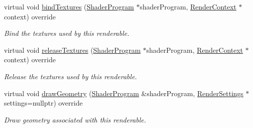 \begin{Indent}
\begin{DoxyCompactItemize}
\mbox{\label{classrev_1_1_label_a011b2eee8123ce24b2483dde4c17dbbf}} 
virtual void \mbox{\hyperlink{classrev_1_1_label_a011b2eee8123ce24b2483dde4c17dbbf}{bind\+Textures}} (\mbox{\hyperlink{classrev_1_1_shader_program}{Shader\+Program}} $\ast$shader\+Program, \mbox{\hyperlink{classrev_1_1_render_context}{Render\+Context}} $\ast$context) override
\begin{DoxyCompactList}\small\item\em Bind the textures used by this renderable. \end{DoxyCompactList}\item 
\mbox{\label{classrev_1_1_label_a73390345a3488441a25b5d5a7e59b8e3}} 
virtual void \mbox{\hyperlink{classrev_1_1_label_a73390345a3488441a25b5d5a7e59b8e3}{release\+Textures}} (\mbox{\hyperlink{classrev_1_1_shader_program}{Shader\+Program}} $\ast$shader\+Program, \mbox{\hyperlink{classrev_1_1_render_context}{Render\+Context}} $\ast$context) override
\begin{DoxyCompactList}\small\item\em Release the textures used by this renderable. \end{DoxyCompactList}\item 
\mbox{\label{classrev_1_1_label_aab4ade6ebc4914f6d825a4f56989e6a9}} 
virtual void \mbox{\hyperlink{classrev_1_1_label_aab4ade6ebc4914f6d825a4f56989e6a9}{draw\+Geometry}} (\mbox{\hyperlink{classrev_1_1_shader_program}{Shader\+Program}} \&shader\+Program, \mbox{\hyperlink{classrev_1_1_render_settings}{Render\+Settings}} $\ast$settings=nullptr) override
\begin{DoxyCompactList}\small\item\em Draw geometry associated with this renderable. \end{DoxyCompactList}\end{DoxyCompactItemize}
\end{Indent}

